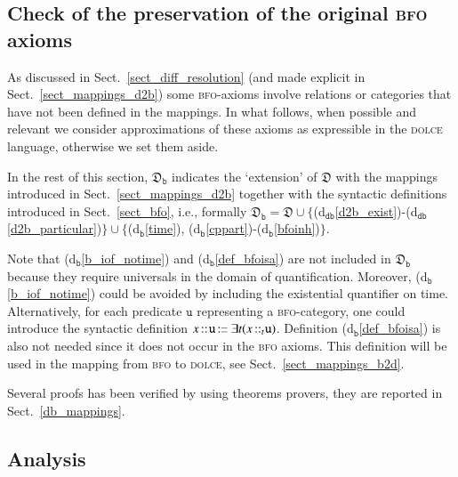 \documentclass[ao]{iosart2x}
\newcommand{\bfoDefLabel}{\textrm{d$_\texttt{b}$}}
\newcommand{\dbDefLabel}{\textrm{d$_\texttt{db}$}}
\newcommand{\dbThrLabel}{\textrm{t$_\texttt{db}$}}
\newcommand{\refbfodf}[1]{({\bfoDefLabel}\ref{#1})}
\newcommand{\refdbdf}[1]{({\dbDefLabel}\ref{#1})}
\newcommand{\refdbth}[1]{({\dbThrLabel}\ref{#1})}
\newcommand{\cn}[1]{\mathtt{#1}}
\newcommand\textequal{%
 \rule[.08ex]{5pt}{0.35pt}\llap{\rule[.78ex]{5pt}{0.35pt}}}
\newcommand{\sdef}{{\hspace{1.5pt}:\hspace{-2.5pt}\textequal\hspace{3pt}}}
\newcommand{\dolce}{{\textsc{dolce}}}
\newcommand{\bfo}{{\textsc{bfo}}}
\newcommand {\thdolce} {\ensuremath{\mathfrak{D}}}
\newcommand {\dbmap} {\ensuremath{\mathfrak{M}_\texttt{db}}}
\newcommand {\thdolcedbmap} {\ensuremath{\mathfrak{D}_\texttt{b}}}
\newcommand{\bfoiof}[1]{{\,::_{#1\:\!}}}
\begin{document}
\subsection{Check of the preservation of the original {\bfo} axioms}\label{sect_check_bfo_preservation}

As discussed in Sect.~\ref{sect_diff_resolution} (and made explicit in Sect.~\ref{sect_mappings_d2b}) some {\bfo}-axioms involve relations or categories that have not been defined in the mappings. In what follows, when possible and relevant we consider approximations of these axioms as expressible in the {\dolce} language, otherwise we set them aside.

In the rest of this section, $\thdolcedbmap$ indicates the `extension' of $\thdolce$ with the mappings introduced in Sect.~\ref{sect_mappings_d2b} together with the syntactic definitions introduced in Sect.~\ref{sect_bfo}, i.e., formally $\thdolcedbmap = \thdolce \cup \{$\refdbdf{d2b_exist}-\refdbdf{d2b_particular}$\} \cup \{$\refbfodf{time}, \refbfodf{cppart}-\refbfodf{bfoinh}$\}$.

Note that \refbfodf{b_iof_notime} and \refbfodf{def_bfoisa} are not included in $\thdolcedbmap$ because they require universals in the domain of quantification. Moreover, \refbfodf{b_iof_notime} could be avoided by including the existential quantifier on time. Alternatively, for each predicate $\cn{u}$ representing a {\bfo}-category, one could introduce the syntactic definition $x \bfoiof{} \cn{u} \sdef \exists t(x \bfoiof{t} \cn{u})$. Definition \refbfodf{def_bfoisa} is also not needed since it does not occur in the {\bfo} axioms. This definition will be used in the mapping from {\bfo} to {\dolce}, see Sect.~\ref{sect_mappings_b2d}. 


Several proofs has been verified by using theorems provers, they are reported in Sect.~\ref{db_mappings}.


\subsection{Analysis}\label{sect_analysis_d2b}
\end{document}
